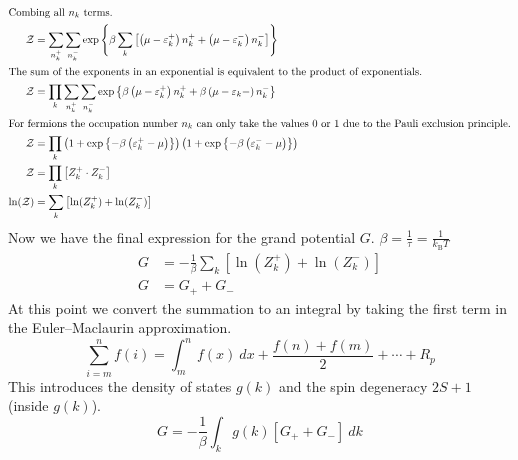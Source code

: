 \documentclass{article}
\begin{document}
\begin{enumerate}
\begin{align}
			\intertext{Combing all $n_k$ terms.}
			\mathcal{Z} &= \sum_{n^+_k} \sum_{n^-_k} \exp\left\{ \beta \sum_{k} \left[ \left( \mu - \varepsilon_k^+ \right) n_k^+ + \left( \mu - \varepsilon_k^- \right) n_k^- \right] \right\} \\
			\intertext{The sum of the exponents in an exponential is equivalent to the product of exponentials.}
			\mathcal{Z} &= \prod_{k} \sum_{n^+_k} \sum_{n^-_k} \exp\left\{ \beta \left( \mu - \varepsilon_k^+ \right) n_k^+ + \beta \left( \mu - \varepsilon_k- \right) n_k^- \right\} \\
			\intertext{For fermions the occupation number $n_k$ can only take the values $0$ or $1$ due to the Pauli exclusion principle.}
			\mathcal{Z} &= \prod_{k} \left( 1 + \exp\left\{ -\beta \left( \varepsilon_k^+ - \mu \right) \right\} \right) \left( 1 + \exp\left\{ -\beta \left( \varepsilon_k^- - \mu \right) \right\} \right) \\
			\mathcal{Z} &= \prod_{k} \left[Z^+_k \cdot Z^-_k\right] \\
			\ln(\mathcal{Z}) &= \sum_{k} \left[ \ln(Z^+_k) + \ln(Z^-_k) \right]
		\end{align}
		Now we have the final expression for the grand potential $G$. $\beta = \frac{1}{\tau} = \frac{1}{k_\mathrm{B}T}$
		\begin{align}
			G &= -\frac{1}{\beta} \sum_{k} \left[ \ln(Z^+_k) + \ln(Z^-_k) \right] \\
			G &= G_+ + G_-
		\end{align}
		At this point we convert the summation to an integral by taking the first term in the Euler–Maclaurin approximation.
		\begin{equation}
			\sum_{i=m}^{n} f(i) = \int_{m}^{n} f(x) \ dx + \frac{f(n) + f(m)}{2} + \cdots + R_p
		\end{equation}
		This introduces the density of states $g(k)$ and the spin degeneracy \(2S+1\) (inside $g(k)$).
		\begin{equation}
			G = -\frac{1}{\beta} \int_k g(k) \left[ G_+ + G_- \right] \ dk
		\end{equation}
	
\clearpage
		

\end{enumerate}
\end{document}
